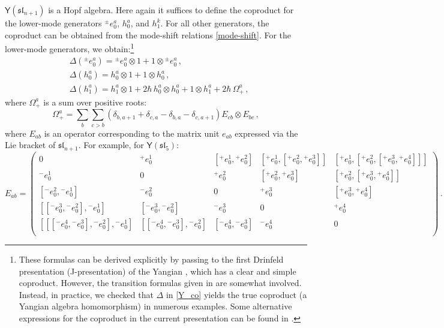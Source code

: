 \documentclass[10pt]{article}
\theoremstyle{definition}
\def\fl{\mathfrak{l}}
\def\fs{\mathfrak{s}}
\def\fs{\mathfrak{s}}
\def\myY{{\mathsf{Y}}}
\def\lm{\limits}
\numberwithin{equation}{section}
\begin{document}
$\myY(\fs\fl_{n+1})$ is a Hopf algebra. 
Here again it suffices to define the coproduct for the lower-mode generators ${}^{\pm}e^a_0$, $h_0^a$, and $h_1^k$.
For all other generators, the coproduct can be obtained from the mode-shift relations \eqref{mode-shift}.
For the lower-mode generators, we obtain:\footnote{
These formulas can be derived explicitly by passing to the first Drinfeld presentation (J-presentation) of the Yangian \cite{Drinfeld1}, which has a clear and simple coproduct.
However, the transition formulas given in \cite{Drinfeld2} are somewhat involved.
Instead, in practice, we checked that $\Delta$ in \eqref{Y_co} yields the true coproduct (a Yangian algebra homomorphism) in numerous examples.
Some alternative expressions for the coproduct in the current presentation can be found in \cite{Crampe2004,GuayNakajimaWendlandt2018}.
}
\begin{equation}\label{Y_co}
	\begin{aligned}
		& \Delta\left( {}^{\pm}e^{a}_0\right)={}^{\pm}e^{a}_0\otimes 1+1\otimes {}^{\pm}e^{a}_0\,,\\
		& \Delta\left( h_0^a\right)=h_0^a\otimes 1+1\otimes h_0^a\,,\\
		& \Delta\left( h_1^a\right)=h_1^a\otimes 1+2\hbar\, h_0^a\otimes h_0^a+1\otimes h_1^a+2\hbar\,\Omega_+^a\,,
	\end{aligned}
\end{equation}
where $\Omega_+^a$ is a sum over positive roots:
\begin{equation}\label{Omega}
	\Omega_+^a=\sum\lm_{b}\sum\lm_{c>b}\left(\delta_{b,a+1}+\delta_{c,a}-\delta_{b,a}-\delta_{c,a+1}\right)E_{cb}\otimes E_{bc}\,,
\end{equation}
where $E_{ab}$ is an operator corresponding to the matrix  unit $e_{ab}$ expressed via the Lie bracket of $\fs\fl_{n+1}$.
For example, for $\myY(\fs\fl_5)$:
\begin{equation}
	E_{ab}=\begin{pmatrix}
			0 & {}^+e_0^1 & [{}^+e_0^1,{}^+e_0^2] & [{}^+e_0^1,[{}^+e_0^2,{}^+e_0^3]] & [{}^+e_0^1,[{}^+e_0^2,[{}^+e_0^3,{}^+e_0^4]]] \\
			{}^-e_0^1 & 0 & {}^+e_0^2 & [{}^+e_0^2,{}^+e_0^3] & [{}^+e_0^2,[{}^+e_0^3,{}^+e_0^4]] \\
			[{}^-e_0^2,{}^-e_0^1] & {}^-e_0^2 & 0 & {}^+e_0^3 & [{}^+e_0^3,{}^+e_0^4] \\
			[[{}^-e_0^3,{}^-e_0^2],{}^-e_0^1] & [{}^-e_0^3,{}^-e_0^2] & {}^-e_0^3 & 0 & {}^+e_0^4 \\
			[[[{}^-e_0^4,{}^-e_0^3],{}^-e_0^2],{}^-e_0^1] & [[{}^-e_0^4,{}^-e_0^3],{}^-e_0^2] & [{}^-e_0^4,{}^-e_0^3] & {}^-e_0^4 & 0 \\
		\end{pmatrix}\,.
\end{equation}
\end{document}
